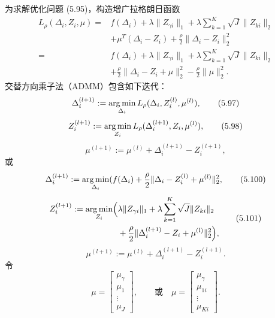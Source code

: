 为求解优化问题 (5.95)，构造增广拉格朗日函数
\begin{equation}
\begin{aligned}
L_\rho(\Delta_i,Z_i,\mu)
={}&f(\Delta_i)+\lambda\lVert Z_{\gamma i}\rVert_1
+\lambda\sum_{k=1}^K\sqrt J\lVert Z_{ki}\rVert_2\\
&+\mu^T(\Delta_i-Z_i)+\frac\rho2\lVert\Delta_i-Z_i\rVert_2^2\\
={}&f(\Delta_i)+\lambda\lVert Z_{\gamma i}\rVert_1
+\lambda\sum_{k=1}^K\sqrt J\lVert Z_{ki}\rVert_2\\
&+\frac\rho2\lVert\Delta_i-Z_i+\mu\rVert_2^2-\frac\rho2\lVert\mu\rVert_2^2.
\end{aligned}
\tag{5.96}
\end{equation}
交替方向乘子法（ADMM）包含如下迭代：
\begin{equation}
\Delta_i^{(l+1)}:=\operatorname*{arg\,min}_{\Delta_i}L_\rho(\Delta_i,Z_i^{(l)},\mu^{(l)}),
\tag{5.97}
\end{equation}
\begin{equation}
Z_i^{(l+1)}:=\operatorname*{arg\,min}_{Z_i}L_\rho(\Delta_i^{(l+1)},Z_i,\mu^{(l)}),
\tag{5.98}
\end{equation}
\begin{equation}
\mu^{(l+1)}:=\mu^{(l)}+\Delta_i^{(l+1)}-Z_i^{(l+1)},
\tag{5.99}
\end{equation}
或
\begin{equation}
\Delta_i^{(l+1)}:=\operatorname*{arg\,min}_{\Delta_i}
(f(\Delta_i)+\frac\rho2\lVert\Delta_i-Z_i^{(l)}+\mu^{(l)}\rVert_2^2,
\tag{5.100}
\end{equation}
\begin{equation}
\begin{aligned}
Z_i^{(l+1)}:=\operatorname*{arg\,min}_{Z_i}\Bigl(&\lambda\lVert Z_{\gamma i}\rVert_1
+\lambda\sum_{k=1}^K\sqrt J\lVert Z_{ki}\rVert_2\\
&+\frac\rho2\lVert\Delta_i^{(l+1)}-Z_i+\mu^{(l)}\rVert_2^2\Bigr),
\end{aligned}
\tag{5.101}
\end{equation}
\begin{equation}
\mu^{(l+1)}:=\mu^{(l)}+\Delta_i^{(l+1)}-Z_i^{(l+1)}.
\tag{5.102}
\end{equation}
令
\[
\mu=\begin{bmatrix}\mu_\gamma\\\mu_1\\\vdots\\\mu_J\end{bmatrix},\qquad
\text{或}\quad\mu=\begin{bmatrix}\mu_\gamma\\\mu_{1i}\\\vdots\\\mu_{Ki}\end{bmatrix}.
\]
